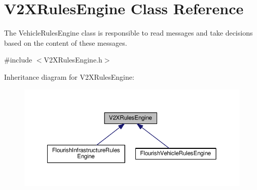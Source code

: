 \hypertarget{classV2XRulesEngine}{}\section{V2\+X\+Rules\+Engine Class Reference}
\label{classV2XRulesEngine}


The Vehicle\+Rules\+Engine class is responsible to read messages and take decisions based on the content of these messages.  




{\ttfamily \#include $<$V2\+X\+Rules\+Engine.\+h$>$}



Inheritance diagram for V2\+X\+Rules\+Engine\+:\nopagebreak
\begin{figure}[H]
\begin{center}
\leavevmode
\includegraphics[width=350pt]{classV2XRulesEngine__inherit__graph}
\end{center}
\end{figure}
